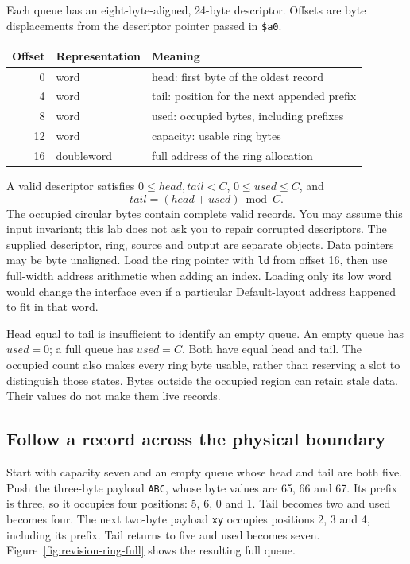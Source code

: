 Each queue has an eight-byte-aligned, 24-byte descriptor. Offsets are byte
displacements from the descriptor pointer passed in \texttt{\$a0}.

\begin{center}
  \begin{tabular}{rll}
    \toprule
    Offset & Representation & Meaning                                     \\
    \midrule
    0      & word           & head: first byte of the oldest record       \\
    4      & word           & tail: position for the next appended prefix \\
    8      & word           & used: occupied bytes, including prefixes    \\
    12     & word           & capacity: usable ring bytes                 \\
    16     & doubleword     & full address of the ring allocation         \\
    \bottomrule
  \end{tabular}
\end{center}

A valid descriptor satisfies $0\leq head,tail<C$, $0\leq used\leq C$, and
\[
  tail=(head+used)\bmod C.
\]
The occupied circular bytes contain complete valid records. You may assume this
input invariant; this lab does not ask you to repair corrupted descriptors.
The supplied descriptor, ring, source and output are separate objects. Data pointers
may be byte unaligned. Load the ring pointer with \texttt{ld} from offset 16, then
use full-width address arithmetic when adding an index. Loading only its low word
would change the interface even if a particular Default-layout address happened
to fit in that word.

Head equal to tail is insufficient to identify an empty queue. An empty queue has
$used=0$; a full queue has $used=C$. Both have equal head and tail. The occupied
count also makes every ring byte usable, rather than reserving a slot to distinguish
those states. Bytes outside the occupied region can retain stale data. Their
values do not make them live records.

\subsection*{Follow a record across the physical boundary}

Start with capacity seven and an empty queue whose head and tail are both five.
Push the three-byte payload \texttt{ABC}, whose byte values are 65, 66 and 67.
Its prefix is three, so it occupies four positions: 5, 6, 0 and 1. Tail becomes
two and used becomes four. The next two-byte payload \texttt{xy} occupies positions
2, 3 and 4, including its prefix. Tail returns to five and used becomes seven.
Figure~\ref{fig:revision-ring-full} shows the resulting full queue.

